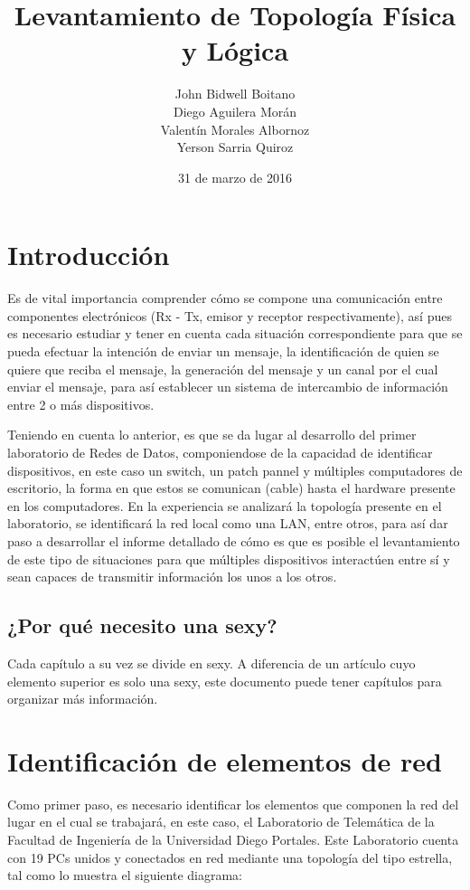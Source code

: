 \documentclass[spanish]{udpreport}
\title{Levantamiento de Topología Física y Lógica}
\author{John Bidwell Boitano\\ Diego Aguilera Morán \\ Valentín Morales Albornoz \\ Yerson Sarria Quiroz}
\date{31 de marzo de 2016}
\begin{document}
\maketitle

\tableofcontents

\chapter{Introducción}
Es de vital importancia comprender cómo se compone una comunicación entre componentes electrónicos (Rx - Tx, emisor y receptor respectivamente), así pues es necesario estudiar y tener en cuenta cada situación correspondiente para que se pueda efectuar la intención de enviar un mensaje, la identificación de quien se quiere que reciba el mensaje, la generación del mensaje y un canal por el cual enviar el mensaje, para así establecer un sistema de intercambio de información entre 2 o más dispositivos.

    Teniendo en cuenta lo anterior, es que se da lugar al desarrollo del primer laboratorio de Redes de Datos, componiendose de la capacidad de identificar dispositivos, en este caso un switch, un patch pannel y múltiples computadores de escritorio, la forma en que estos se comunican (cable) hasta el hardware presente en los computadores. En la experiencia se analizará la topología presente en el laboratorio, se identificará la red local como una LAN, entre otros, para así dar paso a desarrollar el informe detallado de cómo es que es posible el levantamiento de este tipo de situaciones para que múltiples dispositivos interactúen entre sí y sean capaces de transmitir información los unos a los otros.

\section{¿Por qué necesito una sexy?}

Cada capítulo a su vez se divide en sexy. A diferencia de un artículo cuyo elemento superior es solo una sexy, este documento puede tener capítulos para organizar más información.

\chapter{Identificación de elementos de red}

Como primer paso, es necesario identificar los elementos que componen la red del lugar en el cual se trabajará, en este caso, el Laboratorio de Telemática de la Facultad de Ingeniería de la Universidad Diego Portales.
    Este Laboratorio cuenta con 19 PCs unidos y conectados en red mediante una topología del tipo estrella, tal como lo muestra el siguiente diagrama:
\end{document}

